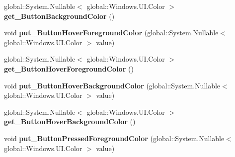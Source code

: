 \begin{DoxyCompactItemize}
\item 
\mbox{\label{class_windows_1_1_u_i_1_1_view_management_1_1_application_view_title_bar_a7e47596433a77023cf07c95e096f0a1c}} 
global\+::\+System.\+Nullable$<$ global\+::\+Windows.\+U\+I.\+Color $>$ {\bfseries get\+\_\+\+Button\+Background\+Color} ()
\item 
\mbox{\label{class_windows_1_1_u_i_1_1_view_management_1_1_application_view_title_bar_a81367f4399734083a0312e932602d91a}} 
void {\bfseries put\+\_\+\+Button\+Hover\+Foreground\+Color} (global\+::\+System.\+Nullable$<$ global\+::\+Windows.\+U\+I.\+Color $>$ value)
\item 
\mbox{\label{class_windows_1_1_u_i_1_1_view_management_1_1_application_view_title_bar_abb2bd226eff90e756e30fce411565e04}} 
global\+::\+System.\+Nullable$<$ global\+::\+Windows.\+U\+I.\+Color $>$ {\bfseries get\+\_\+\+Button\+Hover\+Foreground\+Color} ()
\item 
\mbox{\label{class_windows_1_1_u_i_1_1_view_management_1_1_application_view_title_bar_aab71134c8d012975419633c926f62d40}} 
void {\bfseries put\+\_\+\+Button\+Hover\+Background\+Color} (global\+::\+System.\+Nullable$<$ global\+::\+Windows.\+U\+I.\+Color $>$ value)
\item 
\mbox{\label{class_windows_1_1_u_i_1_1_view_management_1_1_application_view_title_bar_ad8730e54e00f186ed98dfd21d624e119}} 
global\+::\+System.\+Nullable$<$ global\+::\+Windows.\+U\+I.\+Color $>$ {\bfseries get\+\_\+\+Button\+Hover\+Background\+Color} ()
\item 
\mbox{\label{class_windows_1_1_u_i_1_1_view_management_1_1_application_view_title_bar_a435e7ae01a4b3ea59a80006b81279ccb}} 
void {\bfseries put\+\_\+\+Button\+Pressed\+Foreground\+Color} (global\+::\+System.\+Nullable$<$ global\+::\+Windows.\+U\+I.\+Color $>$ value)
\item 
\mbox{\label{class_windows_1_1_u_i_1_1_view_management_1_1_application_view_title_bar_a59124291680af5093b2aa92987f61c76}} 

\end{DoxyCompactItemize}

